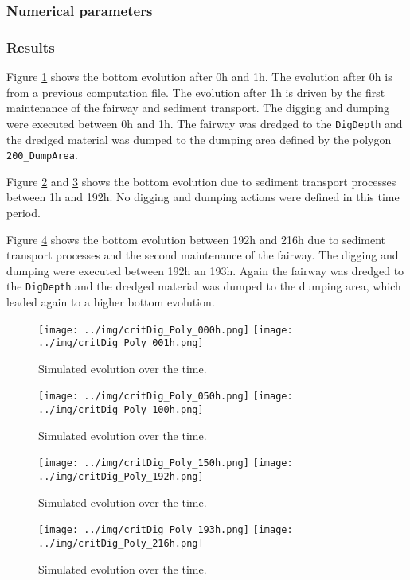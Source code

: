 \subsubsection{Numerical parameters}
%
%
%
\subsubsection{Results}
%
Figure \ref{result12} shows the bottom evolution after 0h and 1h. The evolution after 0h is from a previous computation file. The evolution after 1h  is driven by the first maintenance of the fairway and sediment transport. The digging and dumping were executed between 0h and 1h. The fairway was dredged to the \texttt{DigDepth} and the dredged material was dumped to the dumping area defined by the polygon \texttt{200\_DumpArea}.


 
Figure \ref{result34} and \ref{result56} shows the bottom evolution due to sediment transport processes between 1h and 192h. 
No digging and dumping actions were defined in this time period.

Figure \ref{result78} shows the bottom evolution between 192h and 216h due to sediment transport processes and the second maintenance of the fairway. The digging and dumping were executed between 192h an 193h. Again the fairway was dredged to the
\texttt{DigDepth} and the dredged material was dumped to the dumping area, which leaded again to a higher bottom evolution.

\begin{figure} [!h]
	\centering
	\texttt{[image: ../img/critDig\_Poly\_000h.png]}
	\texttt{[image: ../img/critDig\_Poly\_001h.png]}
	\caption{Simulated evolution over the time.}\label{result12}
\end{figure}

\begin{figure} [!h]
	\centering
	\texttt{[image: ../img/critDig\_Poly\_050h.png]}
	\texttt{[image: ../img/critDig\_Poly\_100h.png]}
	\caption{Simulated evolution over the time.}\label{result34}
\end{figure}

\begin{figure} [!h]
	\centering
	\texttt{[image: ../img/critDig\_Poly\_150h.png]}
	\texttt{[image: ../img/critDig\_Poly\_192h.png]}
	\caption{Simulated evolution over the time.}\label{result56}
\end{figure}

\begin{figure} [!h]
	\centering
	\texttt{[image: ../img/critDig\_Poly\_193h.png]}
	\texttt{[image: ../img/critDig\_Poly\_216h.png]}
	\caption{Simulated evolution over the time.}\label{result78}
\end{figure}






